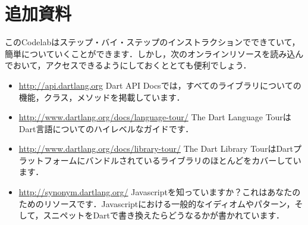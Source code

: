 \section{追加資料}

このCodelabはステップ・バイ・ステップのインストラクションでできていて，簡単についていくことができます．しかし，次のオンラインリソースを読み込んでおいて，アクセスできるようにしておくととても便利でしょう．

\begin{itemize}
\item \url{http://api.dartlang.org} Dart API Docsでは，すべてのライブラリについての機能，クラス，メソッドを掲載しています．
\item \url{http://www.dartlang.org/docs/language-tour/} The Dart Language TourはDart言語についてのハイレベルなガイドです．
\item \url{http://www.dartlang.org/docs/library-tour/} The Dart Library TourはDartプラットフォームにバンドルされているライブラリのほとんどをカバーしています．
\item \url{http://synonym.dartlang.org/} Javascriptを知っていますか？これはあなたのためのリソースです．Javascriptにおける一般的なイディオムやパターン，そして，スニペットをDartで書き換えたらどうなるかが書かれています．
\end{itemize}

\clearpage
